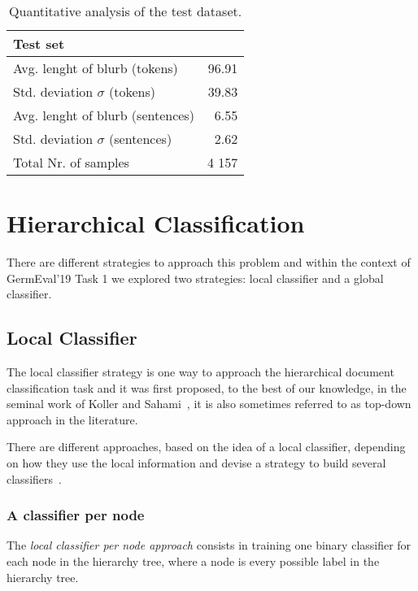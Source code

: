 \documentclass[11pt,a4paper]{article}
\begin{document}
\begin{table}
\small
\begin{center}
\begin{tabular}{|l|r|}
\hline\centering\textbf{Test set}  &         \\
\hline
Avg. lenght of blurb (tokens)              &  96.91             \\
Std. deviation $\sigma$ (tokens)           &  39.83             \\
Avg. lenght of blurb (sentences)           &  6.55              \\
Std. deviation $\sigma$ (sentences)        &  2.62              \\
\hline
Total Nr. of samples                       &  4 157             \\
\hline
\end{tabular}
\end{center}
\caption{\label{quantitivy-analysis-test}Quantitative analysis of the test dataset.}
\end{table}

\section{Hierarchical Classification}\label{hierarchical-clf}

There are different strategies to approach this problem and within the context
of GermEval'19 Task 1 we explored two strategies: local classifier and a
global classifier.

\subsection{Local Classifier}

The local classifier strategy is one way to approach the hierarchical document classification task
and it was first proposed, to the best of our knowledge, in the seminal work of Koller and
Sahami~\citet{Koller:1997:HCD:645526.657130}, it is also sometimes referred to as top-down
approach in the literature.

There are different approaches, based on the idea of a local classifier, depending on how they use
the local information and devise a strategy to build several classifiers~\cite{Silla:2011:SHC:1937796.1937884}.


\subsubsection{A classifier per node} %
The \textit{local classifier per node approach} consists in training one binary classifier for each
node in the hierarchy tree, where a node is every possible label in the hierarchy tree.
\end{document}

